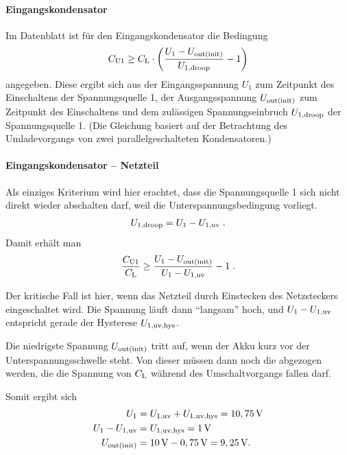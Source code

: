 \paragraph{Eingangskondensator}


Im Datenblatt ist für den Eingangskondensator die Bedingung
\begin{align*}
	C_{\mathrm{U1}} \geq C_{\mathrm{L}} \cdot \left(\frac{U_1 - U_{\mathrm{out(init)}}}{U_{\mathrm{1,droop}}} - 1 \right)
\end{align*}
angegeben. Diese ergibt sich aus der Eingangsspannung $U_1$ zum Zeitpunkt des Einschaltens der Spannungsquelle 1, der Ausgangsspannung $U_{\mathrm{out(init)}}$ zum Zeitpunkt des Einschaltens und dem zulässigen Spannungseinbruch $U_{\mathrm{1,droop}}$ der Spannungsquelle 1. (Die Gleichung basiert auf der Betrachtung des Umladevorgangs von zwei parallelgeschalteten Kondensatoren.)


\paragraph{Eingangskondensator -- Netzteil}

Als einziges Kriterium wird hier erachtet, dass die Spannungsquelle 1 sich nicht direkt wieder abschalten darf, weil die Unterspannungsbedingung vorliegt. \Dah
\begin{align*}
	U_{\mathrm{1,droop}} = U_1 - U_{\mathrm{1,uv}}\;.
\end{align*}
Damit erhält man
\begin{align*}
	\frac{C_{\mathrm{U1}}}{C_{\mathrm{L}}} \geq \frac{U_1 - U_{\mathrm{out(init)}}}{U_1 - U_{\mathrm{1,uv}}} - 1\;.
\end{align*}

Der kritische Fall ist hier, wenn das Netzteil durch Einstecken des Netzsteckers eingeschaltet wird. Die Spannung läuft dann "`langsam"' hoch, und $U_1 - U_{\mathrm{1,uv}}$ entspricht gerade der Hysterese $U_{\mathrm{1,uv,hys}}$.

Die niedrigste Spannung $U_{\mathrm{out(init)}}$ tritt auf, wenn der Akku kurz vor der Unterspannungsschwelle steht. Von dieser müssen dann noch die  abgezogen werden, die die Spannung von $C_{\mathrm{L}}$ während des Umschaltvorgangs fallen darf.

Somit ergibt sich
\begin{align*}
	U_1 & = U_{\mathrm{1,uv}} + U_{\mathrm{1,uv,hys}} = 10,75\,\mathrm{V} \\
	U_1 - U_{\mathrm{1,uv}} & = U_{\mathrm{1,uv,hys}} = 1\,\mathrm{V} \\
	U_{\mathrm{out(init)}} & = 10\,\mathrm{V} - 0,75\,\mathrm{V} = 9,25\,\mathrm{V}.
\end{align*}

